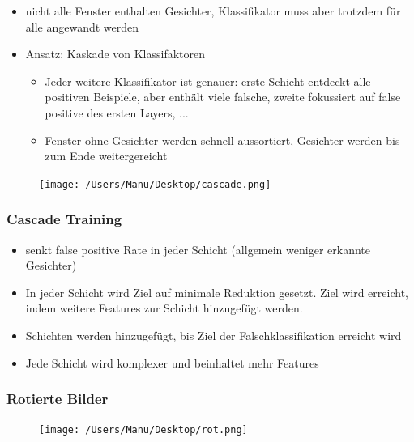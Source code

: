 \documentclass[paper=a4, fontsize=11pt]{scrartcl} %
\numberwithin{equation}{section} %
\numberwithin{figure}{section} %
\numberwithin{table}{section} %
\begin{document}
\begin{minipage}{0.5\textwidth}
\begin{itemize}
\item nicht alle Fenster enthalten Gesichter, Klassifikator muss aber trotzdem für alle angewandt werden
\item Ansatz: Kaskade von Klassifaktoren
\begin{itemize}
\item Jeder weitere Klassifikator ist genauer: erste Schicht entdeckt alle positiven Beispiele, aber enthält viele falsche, zweite fokussiert auf false positive des ersten Layers, ...
\item Fenster ohne Gesichter werden schnell aussortiert, Gesichter werden bis zum Ende weitergereicht
\end{itemize}
\end{itemize}
\end{minipage} \hfill
\begin{minipage}{0.45\textwidth}
\begin{figure}[H]
\texttt{[image: /Users/Manu/Desktop/cascade.png]}
\end{figure}
\end{minipage}

\subsubsection{Cascade Training}

\begin{itemize}
\item senkt false positive Rate in jeder Schicht (allgemein weniger erkannte Gesichter)
\item In jeder Schicht wird Ziel auf minimale Reduktion gesetzt. Ziel wird erreicht, indem weitere Features zur Schicht hinzugefügt werden.
\item Schichten werden hinzugefügt, bis Ziel der Falschklassifikation erreicht wird
\item Jede Schicht wird komplexer und beinhaltet mehr Features
\end{itemize}

\subsubsection{Rotierte Bilder}

\begin{figure}[H]
\texttt{[image: /Users/Manu/Desktop/rot.png]}
\end{figure}
\end{document}
